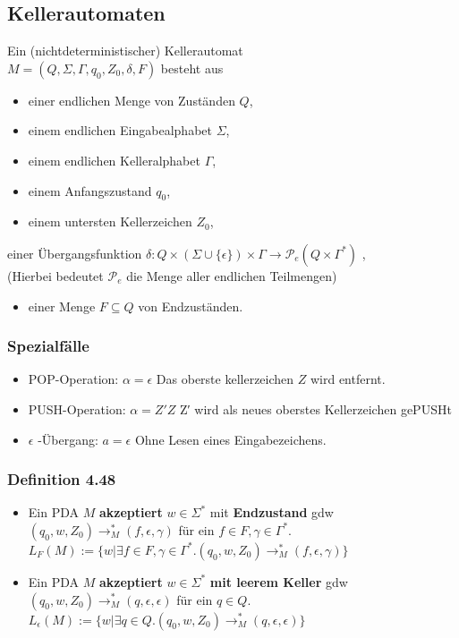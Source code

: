 \documentclass[11pt]{article}
\begin{document}
\subsection{Kellerautomaten}
\label{sec:org4d867a5}
Ein (nichtdeterministischer) Kellerautomat \\
\(M = (Q, \Sigma, \Gamma, q_0, Z_0, \delta, F)\) besteht aus \\
\begin{itemize}
\item einer endlichen Menge von Zuständen \(Q\),
\item einem endlichen Eingabealphabet \(\Sigma\),
\item einem endlichen Kelleralphabet \(\Gamma\),
\item einem Anfangszustand \(q_0\),
\item einem untersten Kellerzeichen \(Z_0\),
\end{itemize}
einer Übergangsfunktion \(\delta: Q \times (\Sigma \cup \{\epsilon\}) \times \Gamma \rightarrow \mathcal{P}_e(Q \times \Gamma^*)\) , \\
(Hierbei bedeutet \(\mathcal{P}_e\) die Menge aller endlichen Teilmengen)
\begin{itemize}
\item einer Menge \(F \subseteq Q\) von Endzuständen.
\end{itemize}
\subsubsection{Spezialfälle}
\label{sec:org9ebb08d}
\begin{itemize}
\item POP-Operation: \(\alpha = \epsilon\)
Das oberste kellerzeichen \(Z\) wird entfernt.
\item PUSH-Operation: \(\alpha = Z'Z\)
Z′ wird als neues oberstes Kellerzeichen gePUSHt
\item \(\epsilon\) -Übergang: \(a = \epsilon\)
Ohne Lesen eines Eingabezeichens.
\end{itemize}
\subsubsection{Definition 4.48}
\label{sec:org0c4a3df}
\begin{itemize}
\item Ein PDA \(M\) \textbf{akzeptiert} \(w \in \Sigma^*\) mit \textbf{Endzustand} gdw \\
\((q_0, w, Z_0) \rightarrow^*_M (f, \epsilon, \gamma)\) für ein \(f \in F, \gamma \in \Gamma^*\). \\

\(L_F(M) := \{w | \exists f \in F, \gamma \in \Gamma^*. (q_0, w, Z_0) \rightarrow^*_M (f,\epsilon,\gamma)\}\)

\item Ein PDA \(M\) \textbf{akzeptiert} \(w \in \Sigma^*\) \textbf{mit leerem Keller} gdw
\((q_0, w, Z_0) \rightarrow^*_M (q, \epsilon, \epsilon)\) für ein \(q \in Q\). \\

\(L_\epsilon(M) := \{w | \exists q \in Q. (q_0, w, Z_0) \rightarrow^*_M (q,\epsilon,\epsilon)\}\)
\end{itemize}
\end{document}
